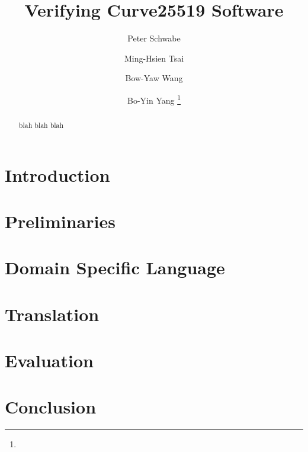 \documentclass{llncs}
\title{Verifying Curve25519 Software}
\author{
Peter Schwabe\inst{2}
\and
Ming-Hsien Tsai\inst{1}
\and
Bow-Yaw Wang\inst{1}
\and
Bo-Yin Yang\inst{1}
%
\thanks{}
}
\institute
{
Institute of Information Science\\
Academia Sinica\\
128 Section 2 Academia Road, Taipei 115-29, Taiwan\\
\email{mhtsai208@gmail.com, bywang@iis.sinica.edu.tw, by@crypto.tw}
\and
Radboud University Nijmegen\\
Digital Security Group\\
PO Box 9010, 6500GL Nijmegen, The Netherlands\\
\email{peter@cryptojedi.org}
}
\author{\vspace*{-1cm} }
\institute{\vspace*{-1cm}\ }
\begin{document}
\maketitle

\begin{abstract}
  blah blah blah
\end{abstract}

\section{Introduction}
\label{section:introduction}


\section{Preliminaries}
\label{section:preliminaries}


\section{Domain Specific Language}
\label{section:domain-specific-language}


\section{Translation}
\label{section:translation}


\section{Evaluation}
\label{section:evaluation}


\section{Conclusion}
\label{section:conclusion}



%


\end{document}
